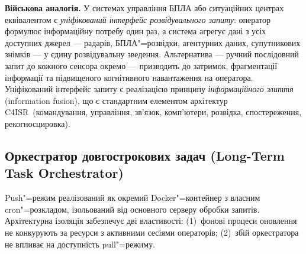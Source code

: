 \textbf{Військова аналогія.}
У системах управління БПЛА або ситуаційних центрах еквівалентом є \emph{уніфікований інтерфейс розвідувального запиту}: оператор формулює інформаційну потребу один раз, а система агрегує дані з усіх доступних джерел --- радарів, БПЛА"=розвідки, агентурних даних, супутникових знімків --- у єдину розвідувальну зведення.
Альтернатива --- ручний послідовний запит до кожного сенсора окремо --- призводить до затримок, фрагментації інформації та підвищеного когнітивного навантаження на оператора.
Уніфікований інтерфейс запиту є реалізацією принципу \emph{інформаційного злиття} (information fusion), що є стандартним елементом архітектур C4ISR~(командування, управління, зв'язок, комп'ютери, розвідка, спостереження, рекогносцировка).

\subsection{Оркестратор довгострокових задач (Long-Term Task Orchestrator)}
\label{sec:orchestrator}

Push"=режим реалізований як окремий Docker"=контейнер з власним cron"=розкладом, ізольований від основного серверу обробки запитів.
Архітектурна ізоляція забезпечує дві властивості: (1)~фонові процеси оновлення не конкурують за ресурси з активними сесіями операторів; (2)~збій оркестратора не впливає на доступність pull"=режиму.

